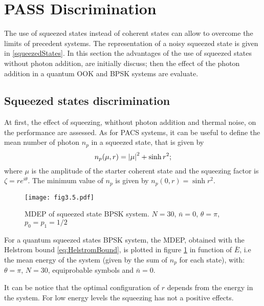\section{PASS Discrimination}
    The use of squeezed states instead of coherent states can allow to overcome the limits
    of precedent systems. The representation of a noisy squeezed state is given in 
    \ref{squeezedStates}. In this section the advantages of the use of squeezed states 
    without photon addition, are initially discuss; then the effect of the photon addition
    in a quantum OOK and BPSK systems are evaluate.

    \subsection{Squeezed states discrimination}
        At first, the effect of squeezing, whithout photon addition and thermal noise, on the
        performance are assessed. As for PACS systems, it can be useful to define the mean 
        number of photon $n_p$ in a squeezed state, that is given by
        \begin{equation}
            n_p(\mu,r) = \absolutevalue{\mu}^2 + \sinh{r}^2;
        \end{equation}
        where $\mu$ is the amplitude of the starter coherent state and the squeezing factor
        is $\zeta = r e^{i\theta}$. The minimum value of $n_p$ is given by $n_p(0,r) = \sinh{r}^2$.

        \begin{figure}[ht]
            \begin{center}
                \texttt{[image: fig3.5.pdf]}
                \caption{MDEP of squeezed state BPSK system. 
                    $N=30$, $\bar{n}=0$, $\theta=\pi$, $p_0=p_1=1/2$}
                \label{fig:3.5}
            \end{center}     
        \end{figure}
        For a quantum squeezed states BPSK system, the MDEP, obtained with the Helstrom bound 
        \ref{eq:HelstromBound}, is plotted in figure \ref{fig:3.5} in function of $\bar{E}$,
        i.e the mean energy of the system (given by the sum of $n_p$ for each state), with:
        $\theta=\pi$, $N=30$, equiprobable symbols and $\bar{n}=0$.

        It can be notice that the optimal configuration of $r$ depends from the energy in the 
        system. For low energy levels the squeezing has not a positive effects.

